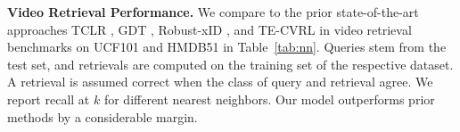 \documentclass[letterpaper]{article} %
\newcommand{\etal}{\emph{et al.}}
\begin{document}
\noindent \textbf{Video Retrieval Performance.}
We compare to the prior state-of-the-art approaches TCLR \cite{dave2021tclr}, GDT \cite{patrick2020multi}, Robust-xID \cite{morgado2021robust}, and TE-CVRL \cite{jenni2021time} in video retrieval benchmarks on UCF101 and HMDB51 in Table~\ref{tab:nn}.
Queries stem from the test set, and retrievals are computed on the training set of the respective dataset.
A retrieval is assumed correct when the class of query and retrieval agree.
We report recall at $k$ for different nearest neighbors.
Our model outperforms prior methods by a considerable margin.



\end{document}
